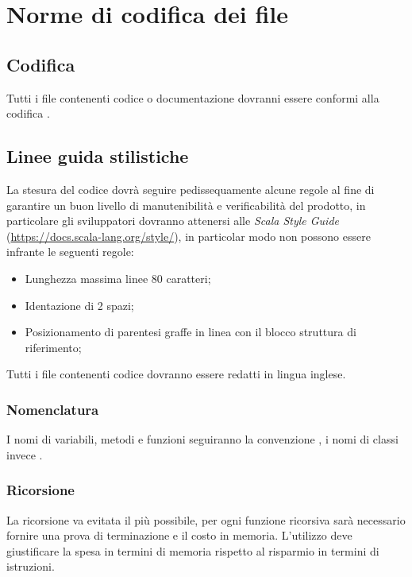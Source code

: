 \documentclass{scalatekids-article}
\begin{document}
\section{Norme di codifica dei file}
\subsection{Codifica}
Tutti i file contenenti codice o documentazione dovranni essere conformi alla
codifica .
\subsection{Linee guida stilistiche}
La stesura del codice dovrà seguire pedissequamente alcune regole al fine di
garantire un buon livello di manutenibilità e verificabilità del prodotto, in
particolare gli sviluppatori dovranno attenersi alle \textit{Scala Style Guide}
(\url{https://docs.scala-lang.org/style/}), in particolar modo non possono
essere infrante le seguenti regole:
\begin{itemize}
  \item Lunghezza massima linee 80 caratteri;
  \item Identazione di 2 spazi;
  \item Posizionamento di parentesi graffe in linea con il blocco struttura di
    riferimento;
\end{itemize}
Tutti i file contenenti codice dovranno essere redatti in lingua inglese.
\subsubsection{Nomenclatura}
I nomi di variabili, metodi e funzioni seguiranno la convenzione
\textit{}, i nomi di classi invece
\textit{}.
\subsubsection{Ricorsione}
La ricorsione va evitata il più possibile, per ogni funzione ricorsiva sarà
necessario fornire una prova di terminazione e il costo in memoria. L'utilizzo
deve giustificare la spesa in termini di memoria rispetto al risparmio in
termini di istruzioni.
\end{document}
